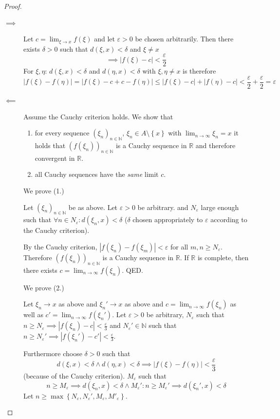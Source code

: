 \documentclass{article}
\newcommand{\set}[1]{\left\{#1\right\}}
\newcommand{\card}[1]{\left|#1\right|}
\begin{document}
\begin{proof}
  \begin{description}
    \item[$\implies$] 
      Let $c = \lim_{\xi\to x} f(\xi)$ and let $\varepsilon > 0$ be chosen arbitrarily.
      Then there exists $\delta > 0$ such that $d(\xi,x) < \delta$ and $\xi \neq x$
      \[ \implies \card{f(\xi) - c} < \frac\varepsilon2 \]
      For $\xi, \eta$: $d(\xi, x) < \delta$ and $d(\eta, x) < \delta$ with $\xi, \eta \neq x$
      is therefore
      \[ \card{f(\xi) - f(\eta)} = \card{f(\xi) - c + c - f(\eta)} \leq \card{f(\xi) - c} + \card{f(\eta) - c} < \frac\varepsilon2 + \frac\varepsilon2 = \varepsilon \]
    \item[$\impliedby$]
      Assume the Cauchy criterion holds. We show that
      \begin{enumerate}
        \item for every sequence $(\xi_n)_{n\in\mathbb N}$, $\xi_n \in A \setminus \set{x}$ with $\lim_{n\to\infty} \xi_n = x$ it holds that
        $(f(\xi_n))_{n\in\mathbb N}$ is a Cauchy sequence in $\mathbb R$ and therefore convergent in $\mathbb R$.
        \item all Cauchy sequences have the \emph{same} limit $c$.
      \end{enumerate}
      We prove (1.)

      Let $(\xi_n)_{n\in\mathbb N}$ be as above. Let $\varepsilon > 0$ be arbitrary.
      and $N_{\varepsilon}$ large enough such that $\forall n \in N_{\varepsilon}: d(\xi_n, x) < \delta$
      ($\delta$ chosen appropriately to $\varepsilon$ according to the Cauchy criterion).

      By the Cauchy criterion, $\card{f(\xi_n) - f(\xi_m)} < \varepsilon$ for all $m,n \geq N_{\varepsilon}$.
      Therefore $(f(\xi_n))_{n\in\mathbb N}$ is a Cauchy sequence in $\mathbb R$.
      If $\mathbb R$ is complete, then there exists $c = \lim_{n\to\infty} f(\xi_n)$. QED.

      We prove (2.)

      Let $\xi_n \to x$ as above and $\xi_n' \to x$ as above and $c = \lim_{n\to\infty} f(\xi_n)$ as well as $c' = \lim_{n\to\infty} f(\xi_n')$. Let $\varepsilon > 0$ be arbitrary, $N_{\varepsilon}$ such that $n \geq N_{\varepsilon} \implies \card{f(\xi_n) - c} < \frac{\varepsilon}{3}$ and $N_{\varepsilon}' \in \mathbb N$ such that $n \geq N_{\varepsilon}' \implies \card{f(\xi_n') - c'} < \frac\varepsilon3$.

      Furthermore choose $\delta > 0$ such that
      \[ d(\xi, x) < \delta \land d(\eta, x) < \delta \implies \card{f(\xi) - f(\eta)} < \frac{\varepsilon}{3} \]
      (because of the Cauchy criterion).
      $M_{\varepsilon}$ such that 
      \[ n \geq M_{\varepsilon} \implies d(\xi_n, x) < \delta \land M_{\varepsilon}': n \geq M_{\varepsilon}' \implies d(\xi_n', x) < \delta \]
      Let $n \geq \max\set{N_{\varepsilon}, N_{\varepsilon}', M_{\varepsilon}, M'_{\varepsilon}}$.


\end{description}
\end{proof}
\end{document}
